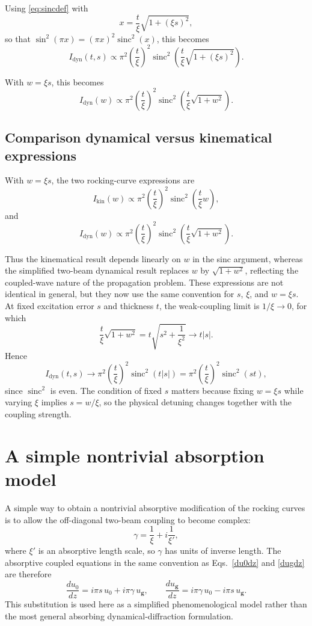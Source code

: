 \documentclass[11pt]{article}
\begin{document}
Using \eqref{eq:sincdef} with
\[
x=\frac{t}{\xi}\sqrt{1+(\xi s)^2},
\]
so that \(\sin^2(\pi x)=(\pi x)^2\operatorname{sinc}^2(x)\), this becomes
\[
I_{\mathrm{dyn}}(t,s)
\propto
\pi^2\left(\frac{t}{\xi}\right)^2
\operatorname{sinc}^2\!\left(
\frac{t}{\xi}\sqrt{1+(\xi s)^2}
\right).
\]

With $w=\xi s$, this becomes 
\[
I_{\mathrm{dyn}}(w)
\propto
\pi^2\left(\frac{t}{\xi}\right)^2
\operatorname{sinc}^2\!\left(
\frac{t}{\xi}\sqrt{1+w^2}
\right).
\]

\subsection{Comparison dynamical versus kinematical expressions}

With \(w=\xi s\), the two rocking-curve expressions are
\[
I_{\mathrm{kin}}(w)\propto
\pi^2\left(\frac{t}{\xi}\right)^2
\operatorname{sinc}^2\!\left(\frac{t}{\xi}w\right),
\]
and
\[
I_{\mathrm{dyn}}(w)\propto
\pi^2\left(\frac{t}{\xi}\right)^2
\operatorname{sinc}^2\!\left(
\frac{t}{\xi}\sqrt{1+w^2}
\right).
\]

Thus the kinematical result depends linearly on \(w\) in the sinc argument, whereas the simplified two-beam dynamical result replaces \(w\) by \(\sqrt{1+w^2}\), reflecting the coupled-wave nature of the propagation problem.
These expressions are not identical in general, but they now use the same convention for \(s\), \(\xi\), and \(w=\xi s\). At fixed excitation error \(s\) and thickness \(t\), the weak-coupling limit is \(1/\xi \to 0\), for which
\[
\frac{t}{\xi}\sqrt{1+w^2}
=
t\sqrt{s^2+\frac{1}{\xi^2}}
\to
t|s|.
\]
Hence
\[
I_{\mathrm{dyn}}(t,s)
\to
\pi^2\left(\frac{t}{\xi}\right)^2\operatorname{sinc}^2(t|s|)
=
\pi^2\left(\frac{t}{\xi}\right)^2\operatorname{sinc}^2(st),
\]
since \(\operatorname{sinc}^2\) is even. The condition of fixed \(s\) matters because fixing \(w=\xi s\) while varying \(\xi\) implies \(s=w/\xi\), so the physical detuning changes together with the coupling strength.

\section{A simple nontrivial absorption model}

A simple way to obtain a nontrivial absorptive modification of the rocking curves is to allow the off-diagonal two-beam coupling to become complex:
\[
\gamma=
\frac{1}{\xi}+i\frac{1}{\xi'},
\]
where \(\xi'\) is an absorptive length scale, so \(\gamma\) has units of inverse length. The absorptive coupled equations in the same convention as Eqs.~\eqref{du0dz} and \eqref{dugdz} are therefore
\[
\frac{d u_0}{dz}= i\pi s\,u_0 + i\pi \gamma\,u_{\mathbf g},
\qquad
\frac{d u_{\mathbf g}}{dz}= i\pi \gamma\,u_0 - i\pi s\,u_{\mathbf g}.
\]
This substitution is used here as a simplified phenomenological model rather than the most general absorbing dynamical-diffraction formulation.
\end{document}
